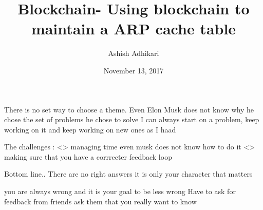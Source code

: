 \documentclass{article}
\title{Blockchain- Using blockchain to maintain a ARP cache table}
\author{Ashish Adhikari}
\date{November 13, 2017}
\begin{document}
  
   \maketitle
   There is no set way to choose a theme. 
   Even Elon Musk does not know why he chose the set of problems he chose to solve
   I can always start on a problem, keep working on it and keep working on new ones as I haad
   

   The challenges  	:
   	<> managing time even musk does not know how to do it
   	<> making sure that you have a corrrecter feedback loop

   	Bottom line.. There are no right answers it is only your character that matters

   	you are always wrong and it is your goal to be less wrong
   	Have to ask for feedback from friends ask them that you really want to know
\end{document}
